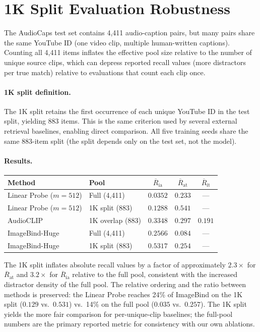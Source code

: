 \documentclass{article}
\newcommand{\avgR}{\overline{R}}
\begin{document}
\section{1K Split Evaluation Robustness}
\label{app:1k_split}

The AudioCaps test set contains 4,411 audio-caption pairs, but many pairs share the same YouTube ID (one video clip, multiple human-written captions).
Counting all 4,411 items inflates the effective pool size relative to the number of unique source clips, which can depress reported recall values (more distractors per true match) relative to evaluations that count each clip once.

\paragraph{1K split definition.}
The 1K split retains the first occurrence of each unique YouTube ID in the test split, yielding 883 items.
This is the same criterion used by several external retrieval baselines, enabling direct comparison.
All five training seeds share the same 883-item split (the split depends only on the test set, not the model).

\paragraph{Results.}
\begin{center}
\footnotesize
\begin{tabular}{llccc}
\toprule
Method & Pool & $\avgR_\mathrm{ia}$ & $\avgR_\mathrm{at}$ & $\avgR_\mathrm{it}$ \\
\midrule
Linear Probe ($m=512$) & Full (4,411) & $0.0352$ & $0.233$ & --- \\
Linear Probe ($m=512$) & 1K split (883) & $0.1288$ & $0.541$ & --- \\
AudioCLIP \citep{guzhov2022audioclip} & 1K overlap (883) & $0.3348$ & $0.297$ & $0.191$ \\
ImageBind-Huge \citep{girdhar2023imagebind} & Full (4,411) & $0.2566$ & $0.084$ & --- \\
ImageBind-Huge \citep{girdhar2023imagebind} & 1K split (883) & $0.5317$ & $0.254$ & --- \\
\bottomrule
\end{tabular}
\end{center}

The 1K split inflates absolute recall values by a factor of approximately $2.3\times$ for $\avgR_\mathrm{at}$ and $3.2\times$ for $\avgR_\mathrm{ia}$ relative to the full pool, consistent with the increased distractor density of the full pool.
The relative ordering and the ratio between methods is preserved: the Linear Probe reaches 24\% of ImageBind on the 1K split ($0.129$ vs.\ $0.531$) vs.\ 14\% on the full pool ($0.035$ vs.\ $0.257$).
The 1K split yields the more fair comparison for per-unique-clip baselines; the full-pool numbers are the primary reported metric for consistency with our own ablations.
\end{document}
